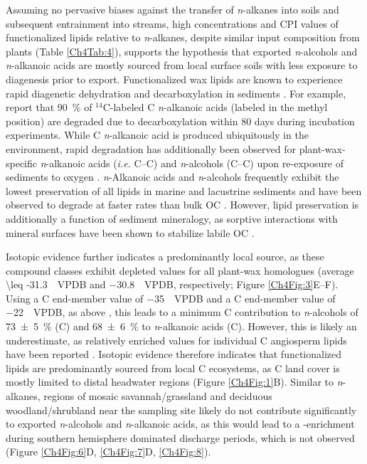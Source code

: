Assuming no pervasive biases against the transfer of \textit{n}-alkanes into soils and subsequent entrainment into streams, high concentrations and CPI values of functionalized lipids relative to \textit{n}-alkanes, despite similar input composition from plants (Table \ref{Ch4Tab:4}), supports the hypothesis that exported \textit{n}-alcohols and \textit{n}-alkanoic acids are mostly sourced from local surface soils with less exposure to diagenesis prior to export. Functionalized wax lipids are known to experience rapid diagenetic dehydration and decarboxylation in sediments \citep{Meyers:1993up,Sun:1994wj,Canuel:1996ta,Sun:1997wr}. For example, \citet{Sun:1997wr} report that \SI{90}{\%} of $^{14}$C-labeled C \textit{n}-alkanoic acids (labeled in the methyl position) are degraded due to decarboxylation within 80 days during incubation experiments. While C \textit{n}-alkanoic acid is produced ubiquitously in the environment, rapid degradation has additionally been observed for plant-wax-specific \textit{n}-alkanoic acids (\textit{i.e.} C--C) and \textit{n}-alcohols (C--C) upon re-exposure of sediments to oxygen \citep{Hoefs:2002wu}. \textit{n}-Alkanoic acids and \textit{n}-alcohols frequently exhibit the lowest preservation of all lipids in marine and lacustrine sediments and have been observed to degrade at faster rates than bulk OC \citep{Cranwell:1981vg,Meyers:1993vwa}. However, lipid preservation is additionally a function of sediment mineralogy, as sorptive interactions with mineral surfaces have been shown to stabilize labile OC \citep[\textit{e.g.}][]{Keil:1994hb,Mayer:1994wn}.

Isotopic evidence further indicates a predominantly local source, as these compound classes exhibit depleted  values for all plant-wax homologues (average \SI{\leq -31.3}{\permil.VPDB} and \SI{-30.8}{\permil.VPDB}, respectively; Figure \ref{Ch4Fig:3}E--F). Using a C end-member value of \SI{-35}{\permil.VPDB} and a C end-member value of \SI{-22}{\permil.VPDB}, as above \citep{Castaneda:2011jb}, this leads to a minimum C contribution to \textit{n}-alcohols of \SI{73 \pm 5}{\%} (C) and \SI{68 \pm 6}{\%} to \textit{n}-alkanoic acids (C). However, this is likely an underestimate, as relatively enriched  values for individual C angiosperm lipids have been reported \citep[\textit{i.e.} up to \SI{-30}{\permil.VPDB}; ][]{Diefendorf:2011hg,Garcin:2014hg}. Isotopic evidence therefore indicates that functionalized lipids are predominantly sourced from local C ecosystems, as C land cover is mostly limited to distal headwater regions (Figure \ref{Ch4Fig:1}B). Similar to \textit{n}-alkanes, regions of mosaic savannah/grassland and deciduous woodland/shrubland near the sampling site likely do not contribute significantly to exported \textit{n}-alcohols and \textit{n}-alkanoic acids, as this would lead to a -enrichment during southern hemisphere dominated discharge periods, which is not observed (Figure \ref{Ch4Fig:6}D, \ref{Ch4Fig:7}D, \ref{Ch4Fig:8}).

